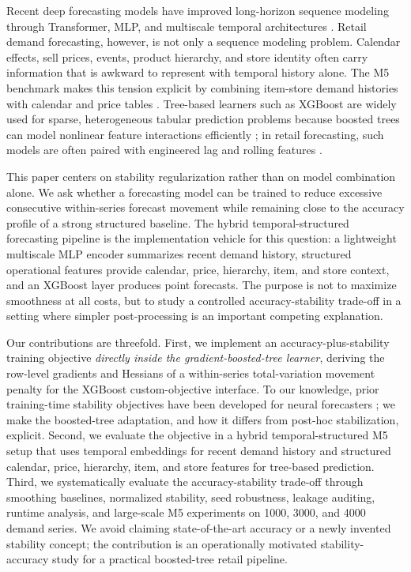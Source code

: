 \documentclass[10pt,conference]{IEEEtran}
\begin{document}
Recent deep forecasting models have improved long-horizon sequence modeling through Transformer, MLP, and multiscale temporal architectures \cite{wang2024timemixer,nie2023patchtst,zhou2021informer,wu2021autoformer,chen2023tsmixer}. Retail demand forecasting, however, is not only a sequence modeling problem. Calendar effects, sell prices, events, product hierarchy, and store identity often carry information that is awkward to represent with temporal history alone. The M5 benchmark makes this tension explicit by combining item-store demand histories with calendar and price tables \cite{makridakis2022m5}. Tree-based learners such as XGBoost are widely used for sparse, heterogeneous tabular prediction problems because boosted trees can model nonlinear feature interactions efficiently \cite{chen2016xgboost}; in retail forecasting, such models are often paired with engineered lag and rolling features \cite{fildes2022retail,makridakis2022m5}.

This paper centers on stability regularization rather than on model combination alone. We ask whether a forecasting model can be trained to reduce excessive consecutive within-series forecast movement while remaining close to the accuracy profile of a strong structured baseline. The hybrid temporal-structured forecasting pipeline is the implementation vehicle for this question: a lightweight multiscale MLP encoder summarizes recent demand history, structured operational features provide calendar, price, hierarchy, item, and store context, and an XGBoost layer produces point forecasts. The purpose is not to maximize smoothness at all costs, but to study a controlled accuracy-stability trade-off in a setting where simpler post-processing is an important competing explanation.

Our contributions are threefold. First, we implement an accuracy-plus-stability training objective \emph{directly inside the gradient-boosted-tree learner}, deriving the row-level gradients and Hessians of a within-series total-variation movement penalty for the XGBoost custom-objective interface. To our knowledge, prior training-time stability objectives have been developed for neural forecasters \cite{vanBelle2023stability,caljon2024dynamic,vanBelle2024probabilistic}; we make the boosted-tree adaptation, and how it differs from post-hoc stabilization, explicit. Second, we evaluate the objective in a hybrid temporal-structured M5 setup that uses temporal embeddings for recent demand history and structured calendar, price, hierarchy, item, and store features for tree-based prediction. Third, we systematically evaluate the accuracy-stability trade-off through smoothing baselines, normalized stability, seed robustness, leakage auditing, runtime analysis, and large-scale M5 experiments on 1000, 3000, and 4000 demand series. We avoid claiming state-of-the-art accuracy or a newly invented stability concept; the contribution is an operationally motivated stability-accuracy study for a practical boosted-tree retail pipeline.
\end{document}
